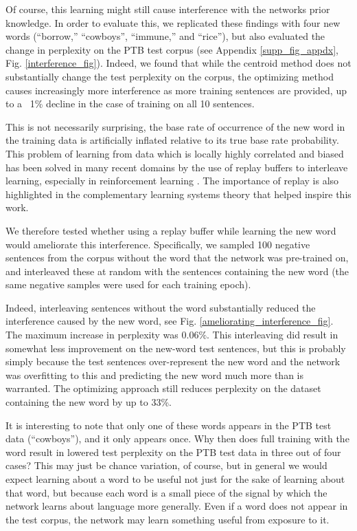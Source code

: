 \documentclass{article}
\begin{document}
Of course, this learning might still cause interference with the networks prior knowledge. In order to evaluate this, we replicated these findings with four new words (``borrow,'' ``cowboys'', ``immune,'' and ``rice''), but also evaluated the change in perplexity on the PTB test corpus (see Appendix \ref{supp_fig_appdx}, Fig. \ref{interference_fig}). Indeed, we found that while the centroid method does not substantially change the test perplexity on the corpus, the optimizing method causes increasingly more interference as more training sentences are provided, up to a ~1\% decline in the case of training on all 10 sentences. \par
This is not necessarily surprising, the base rate of occurrence of the new word in the training data is artificially inflated relative to its true base rate probability. This problem of learning from data which is locally highly correlated and biased has been solved in many recent domains by the use of replay buffers to interleave learning, especially in reinforcement learning \citep[e.g]{Mnih2015}. The importance of replay is also highlighted in the complementary learning systems theory \citep{Kumaran2016} that helped inspire this work. \par
We therefore tested whether using a replay buffer while learning the new word would ameliorate this interference. Specifically, we sampled 100 negative sentences from the corpus without the word that the network was pre-trained on, and interleaved these at random with the sentences containing the new word (the same negative samples were used for each training epoch). \par
Indeed, interleaving sentences without the word substantially reduced the interference caused by the new word, see Fig. \ref{ameliorating_interference_fig}. The maximum increase in perplexity was \(0.06\%\). This interleaving did result in somewhat less improvement on the new-word test sentences, but this is probably simply because the test sentences over-represent the new word and the network was overfitting to this and predicting the new word much more than is warranted. The optimizing approach still reduces perplexity on the dataset containing the new word by up to 33\%. \par
It is interesting to note that only one of these words appears in the PTB test data (``cowboys''), and it only appears once. Why then does full training with the word result in lowered test perplexity on the PTB test data in three out of four cases? This may just be chance variation, of course, but in general we would expect learning about a word to be useful not just for the sake of learning about that word, but because each word is a small piece of the signal by which the network learns about language more generally. Even if a word does not appear in the test corpus, the network may learn something useful from exposure to it.\par 
\end{document}
